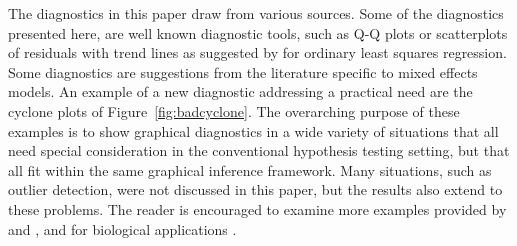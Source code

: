 \documentclass[12pt]{article} %
\newcommand{\hh}[1]{{\color{orange} #1}}
\newcommand{\alnote}[1]{\todo[inline,color=green!40]{#1}} %
\newcommand{\hhnote}[1]{\todo[inline,color=orange!40]{#1}}
\begin{document}

The diagnostics in this paper draw from various sources. Some of the diagnostics presented here, are well known diagnostic  tools, such as Q-Q plots or  scatterplots of residuals with trend lines as suggested by \citet{Cook:1999} for ordinary least squares regression. Some diagnostics are suggestions from the literature specific to mixed effects models. An example of a new diagnostic addressing a  practical need are the cyclone plots of Figure~\ref{fig:badcyclone}. The overarching purpose of  these examples is to show graphical diagnostics in a wide variety of situations that all need special consideration in the conventional hypothesis testing setting, but that all fit within the same graphical inference framework.  Many situations, such as outlier detection, were not discussed in this paper, but the results also extend to these problems. The reader is encouraged to examine more examples provided by \citet{Buja:2009hp} and \citet{mahbub:2013}, and for biological applications \citet{RoyChowdhury:2014}.





  

\end{document}
